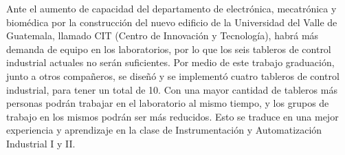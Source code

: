 Ante el aumento de capacidad del departamento de electrónica, mecatrónica y biomédica por la construcción del nuevo edificio de la Universidad del Valle de Guatemala, llamado CIT (Centro de Innovación y Tecnología), habrá más demanda de equipo en los laboratorios, por lo que los seis tableros de control industrial actuales no serán suficientes. Por medio de este trabajo graduación, junto a otros compañeros, se diseñó y se implementó cuatro tableros de control industrial, para tener un total de 10. Con una mayor cantidad de tableros más personas podrán trabajar en el laboratorio al mismo tiempo, y los grupos de trabajo en los mismos podrán ser más reducidos. Esto se traduce en una mejor experiencia y aprendizaje en la clase de Instrumentación y Automatización Industrial I y II. 